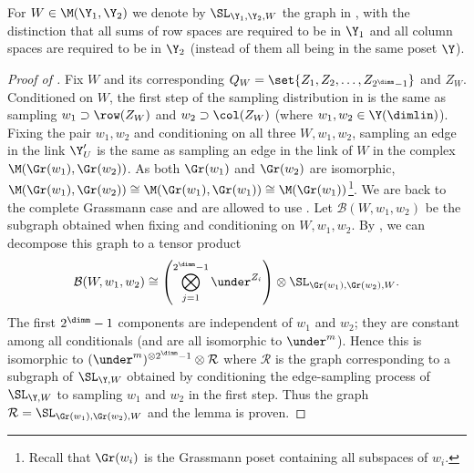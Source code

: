 \begin{definition}
    For \(W \in \M(\Y_1,\Y_2)\) we denote by \(\SL_{\Y_1,\Y_2,W}\) the graph in , with the distinction that all sums of row spaces are required to be in \(\Y_1\) and all column spaces are required to be in \(\Y_2\) (instead of them all being in the same poset \(\Y\)).
\end{definition}
 
\begin{proof}[Proof of ]
    Fix \(W\) and its corresponding \(Q_W = \set{Z_1,Z_2,\dots,Z_{2^{\dimm}-1}}\) and \(Z_W\). Conditioned on \(W\), the first step of the sampling distribution in  is the same as sampling \(w_1 \supset \row(Z_W)\) and \(w_2 \supset \col(Z_W)\) (where \(w_1,w_2 \in \Y(\dimlin)\)). Fixing the pair \(w_1,w_2\) and conditioning on all three \(W,w_1,w_2\), sampling an edge in the link \(\Y'_U\) is the same as sampling an edge in the link of \(W\) in the complex \(\M(\Gr(w_1),\Gr(w_2))\). As both \(\Gr(w_1)\) and \(\Gr(w_2)\) are isomorphic, \(\M(\Gr(w_1),\Gr(w_2)) \cong \M(\Gr(w_1),\Gr(w_1)) \cong \M(\Gr(w_1))\)\footnote{Recall that \(\Gr(w_i)\) is the Grassmann poset containing all subspaces of \(w_i\).}. We are back to the complete Grassmann case and are allowed to use .
    Let \(\mathcal{B}(W,w_1,w_2)\) be the subgraph obtained when fixing and conditioning on \(W,w_1,w_2\). By , we can decompose this graph to a tensor product  
    \[\mathcal{B}(W,w_1,w_2) \cong \left ( \bigotimes_{j=1}^{2^\dimm-1} \under^{Z_i} \right )\otimes \SL_{\Gr(w_1),\Gr(w_2),W}.\] %
    The first \(2^{\dimm}-1\) components are independent of \(w_1\) and \(w_2\); they are constant among all conditionals (and are all isomorphic to \(\under^{m}\)). Hence this is isomorphic to \( (\under^{m})^{\otimes 2^{\dimm}-1} \otimes \mathcal{R}\) where \(\mathcal{R}\) is the graph corresponding to a subgraph of \(\SL_{\Y,W}\) obtained by conditioning the edge-sampling process of \(\SL_{\Y,W}\) to sampling \(w_1\) and \(w_2\) in the first step. Thus the graph \(\mathcal{R} = \SL_{\Gr(w_1),\Gr(w_2),W}\) and the lemma is proven.
\end{proof}

